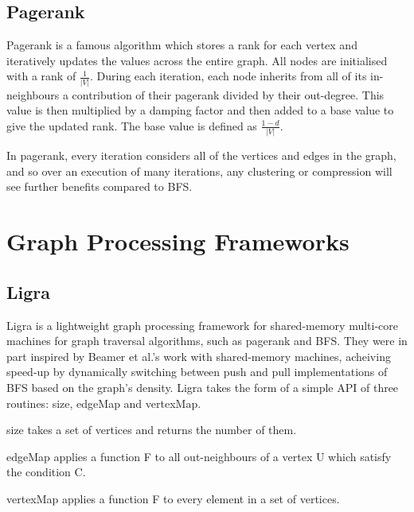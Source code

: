 \subsection{Pagerank}

Pagerank is a famous algorithm which stores a rank for each vertex and iteratively updates the values
across the entire graph. All nodes are initialised with a rank of $\frac{1}{|V|}$. During each
iteration, each node inherits from all of its in-neighbours a contribution of their pagerank divided
by their out-degree. This value is then multiplied by a damping factor and then added to a base value
to give the updated rank. The base value is defined as $\frac{1 - d}{|V|}$.

In pagerank, every iteration considers all of the vertices and edges in the graph, and so over
an execution of many iterations, any clustering or compression will see further benefits compared to
BFS.

\section{Graph Processing Frameworks}

\subsection{Ligra}

Ligra is a lightweight graph processing framework for shared-memory multi-core machines for graph
traversal algorithms, such as pagerank and BFS. They were in part inspired by Beamer et al.'s work
with shared-memory machines, acheiving speed-up by dynamically switching between push and pull implementations of BFS based on the graph's density. Ligra takes the form of a simple API of three
routines: size, edgeMap and vertexMap.

size takes a set of vertices and returns the number of them.

edgeMap applies a function F to all out-neighbours of a vertex U which satisfy the condition C.

vertexMap applies a function F to every element in a set of vertices.

